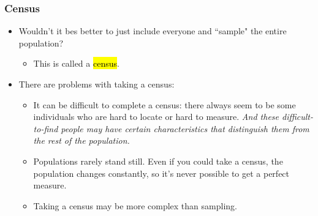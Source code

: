 \documentclass[slidestop,compress,mathserif]{beamer}
\begin{document}
\begin{frame}
\frametitle{Census}

\begin{itemize}

\item Wouldn't it bes better to just include everyone and ``sample" the entire population? 

\begin{itemize}
\item This is called a \hl{census}.
\end{itemize}

\pause

\item There are problems with taking a census:

\begin{itemize}
\item It can be difficult to complete a census: there always seem to be some individuals who are hard to locate or hard to measure. \textit{And these difficult-to-find people may have certain characteristics that distinguish them from the rest of the population.}
\item Populations rarely stand still. Even if you could take a census, the population changes constantly, so it's never possible to get a perfect measure.
\item Taking a census may be more complex than sampling.
\end{itemize}

\end{itemize}

\end{frame}


\begin{frame}

\vfill

\begin{center}
\end{center}


\end{frame}

\end{document}
